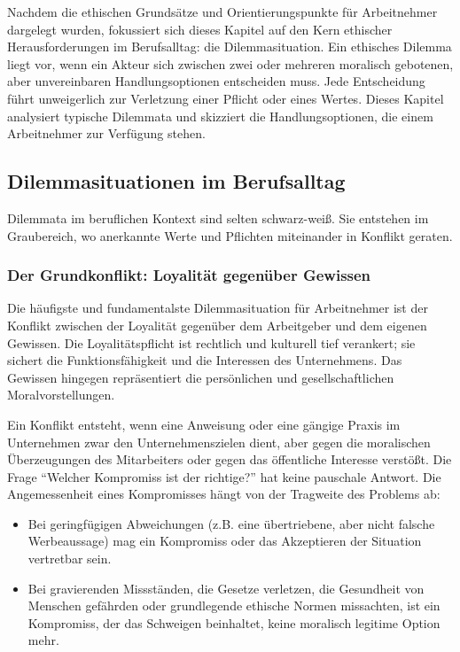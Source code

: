 \documentclass[
    12pt,               %
    a4paper,            %
    ngerman             %
]{scrartcl}
\begin{document}
 


Nachdem die ethischen Grundsätze und Orientierungspunkte für Arbeitnehmer dargelegt wurden, fokussiert sich dieses Kapitel auf den Kern ethischer Herausforderungen im Berufsalltag: die Dilemmasituation. Ein ethisches Dilemma liegt vor, wenn ein Akteur sich zwischen zwei oder mehreren moralisch gebotenen, aber unvereinbaren Handlungsoptionen entscheiden muss. Jede Entscheidung führt unweigerlich zur Verletzung einer Pflicht oder eines Wertes. Dieses Kapitel analysiert typische Dilemmata und skizziert die Handlungsoptionen, die einem Arbeitnehmer zur Verfügung stehen.

\subsection{Dilemmasituationen im Berufsalltag}
Dilemmata im beruflichen Kontext sind selten schwarz-weiß. Sie entstehen im Graubereich, wo anerkannte Werte und Pflichten miteinander in Konflikt geraten.

\subsubsection*{Der Grundkonflikt: Loyalität gegenüber Gewissen}
Die häufigste und fundamentalste Dilemmasituation für Arbeitnehmer ist der Konflikt zwischen der Loyalität gegenüber dem Arbeitgeber und dem eigenen Gewissen. Die Loyalitätspflicht ist rechtlich und kulturell tief verankert; sie sichert die Funktionsfähigkeit und die Interessen des Unternehmens. Das Gewissen hingegen repräsentiert die persönlichen und gesellschaftlichen Moralvorstellungen.

Ein Konflikt entsteht, wenn eine Anweisung oder eine gängige Praxis im Unternehmen zwar den Unternehmenszielen dient, aber gegen die moralischen Überzeugungen des Mitarbeiters oder gegen das öffentliche Interesse verstößt. Die Frage \enquote{Welcher Kompromiss ist der richtige?} hat keine pauschale Antwort. Die Angemessenheit eines Kompromisses hängt von der Tragweite des Problems ab:
\begin{itemize}
    \item Bei geringfügigen Abweichungen (z.B. eine übertriebene, aber nicht falsche Werbeaussage) mag ein Kompromiss oder das Akzeptieren der Situation vertretbar sein.
    \item Bei gravierenden Missständen, die Gesetze verletzen, die Gesundheit von Menschen gefährden oder grundlegende ethische Normen missachten, ist ein Kompromiss, der das Schweigen beinhaltet, keine moralisch legitime Option mehr.
\end{itemize}
\end{document}
